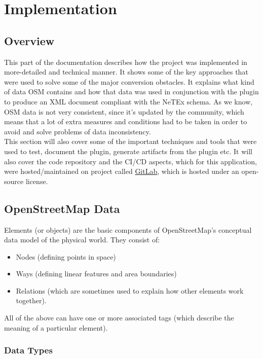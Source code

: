 \chapter{Implementation}
\section{Overview}
This part of the documentation describes how the project was implemented in more-detailed and technical manner. It shows some of the key approaches that were used to solve some of the major conversion obstacles. It explains what kind of data OSM contains and how that data was used in conjunction with the plugin to produce an XML document compliant with the NeTEx schema. As we know, OSM data is not very consistent, since it's updated by the community, which means that a lot of extra measures and conditions had to be taken in order to avoid and solve problems of data inconsistency.\\
This section will also cover some of the important techniques and tools that were used to test, document the plugin, generate artifacts from the plugin etc. It will also cover the code repository and the CI/CD aspects, which for this application, were hosted/maintained on project called \href{https://gitlab.com/}{GitLab}, which is hosted under an open-source license.
\section{OpenStreetMap Data}
Elements (or objects) are the basic components of OpenStreetMap's conceptual data model of the physical world. They consist of:
\begin{itemize}
	\item Nodes (defining points in space)
	\item Ways (defining linear features and area boundaries)
	\item Relations (which are sometimes used to explain how other elements work together).
\end{itemize}
All of the above can have one or more associated tags (which describe the meaning of a particular element). \cite{OSMElements}
\subsection{Data Types}
\label{sec:OSMDataTypes}
